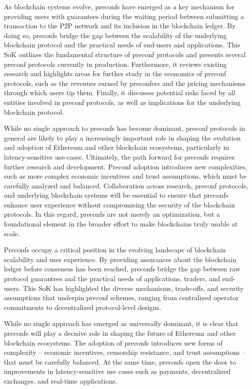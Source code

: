 \documentclass[a4paper]{article}
\theoremstyle{boldstyle}
\begin{document}
As blockchain systems evolve, preconfs have emerged as a key mechanism for providing users with guarantees during the waiting period between submitting a transaction to the P2P network and its inclusion in the blockchain ledger. By doing so, preconfs bridge the gap between the scalability of the underlying blockchain protocol and the practical needs of end-users and applications. This SoK outlines the fundamental structure of preconf protocols and presents several preconf protocols currently in production. Furthermore, it reviews existing research and highlights areas for further study in the economics of preconf protocols, such as the revenues earned by preconfers and the pricing mechanisms through which users tip them. Finally, it discusses potential risks faced by all entities involved in preconf protocols, as well as implications for the underlying blockchain protocol. \par    
While no single approach to preconfs has become dominant, preconf protocols in general are likely to play a increasingly important role in shaping the evolution and adoption of Ethereum and other blockchain ecosystems, particularly in latency-sensitive use-cases.
Ultimately, the path forward for preconfs requires further research and development. Preconf adoption introduces new complexities, such as more complex economic incentives and trust assumptions, which must be carefully analyzed and balanced. Collaboration across research, preconf protocols, and underlying blockchain systems will be essential to ensure that preconfs enhance user experience without compromising the security of the blockchain protocols. In this regard, preconfs are not merely an optimization, but a foundational element in the broader effort to make blockchains truly usable at scale.


 


\iffalse



Preconfs occupy a critical position in the evolving landscape of blockchain scalability and user experience. By providing assurances about the blockchain ledger before consensus has been reached, preconfs bridge the gap between raw protocol guarantees and the practical needs of applications, traders, and end-users. This SoK has highlighted the diverse mechanisms, trade-offs, and security assumptions that underpin preconf schemes, ranging from centralized operator commitments to decentralized protocol-level designs.

While no single approach has emerged as universally dominant, it is clear that preconfs will play a decisive role in shaping the future of Ethereum and other blockchain ecosystems. The adoption of preconfs introduces new forms of complexity -- economic incentives, censorship resistance, and trust assumptions -- that must be carefully balanced. At the same time, preconfs open the door to improvements in latency-sensitive use cases such as payments, decentralized exchanges, and real-time applications.
\end{document}

